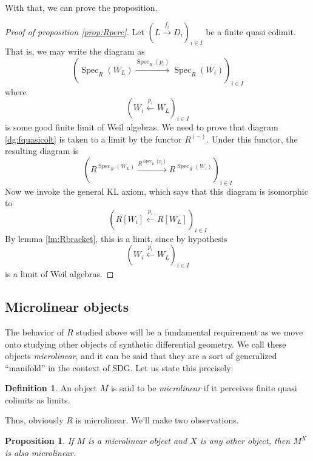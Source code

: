 \documentclass[11pt]{article}
\newtheorem{proposition}{Proposition}[section]
\theoremstyle{definition}
\newtheorem{defn}{Definition}[section]
\newcommand{\farg}{-} %
\DeclareMathOperator{\spec}{Spec}
\numberwithin{equation}{section}
\begin{document}
With that, we can prove the proposition.

\begin{proof}[Proof of proposition \ref{prop:Rperc}]
  Let \( \left(L\stackrel{f_i}{\longrightarrow}D_i\right)_{i\in I} \) be a finite quasi colimit. That is, we may write the diagram as
  \begin{equation}
    \left(\spec_R(W_L)\stackrel{\spec_R(p_i)}{\longrightarrow}\spec_R(W_i)\right)_{i\in I}
    \label{dg:fquasicolt}
  \end{equation}
  where
  \begin{equation*}
   \left(W_i\stackrel{p_i}{\longleftarrow}W_L\right)_{i\in I}
  \end{equation*}
  is some good finite limit of Weil algebras. We need to prove that diagram \ref{dg:fquasicolt} is taken to a limit by the functor \( R^{(\farg)} \). Under this functor, the resulting diagram is
  \begin{equation}
    \left(R^{\spec_R(W_L)}\stackrel{R^{\spec_R(p_i)}}{\longrightarrow}R^{\spec_R(W_i)}\right)_{i\in I}
    \label{dg:Rfqc}
  \end{equation}
  Now we invoke the general KL axiom, which says that this diagram is isomorphic to
  \begin{equation*}
    \left(R[W_i]\stackrel{p_i}{\longleftarrow}R[W_L]\right)_{i\in I}
  \end{equation*}
  By lemma \ref{lm:Rbracket}, this is a limit, since by hypothesis
  \begin{equation*}
   \left(W_i\stackrel{p_i}{\longleftarrow}W_L\right)_{i\in I}
  \end{equation*} 
  is a limit of Weil algebras.
\end{proof}

\subsection{Microlinear objects}

The behavior of \( R \) studied above will be a fundamental requirement as we move onto studying other objects of synthetic differential geometry. We call these objects \emph{microlinear}, and it can be said that they are a sort of generalized ``manifold'' in the context of SDG. Let us state this precisely:

\begin{defn}
  An object \( M \) is said to be \emph{microlinear} if it perceives finite quasi colimits as limits.
\end{defn}

Thus, obviously \( R \) is microlinear. We'll make two observations.

\begin{proposition}
  If \( M \) is a microlinear object and \( X \) is any other object, then \( M^X \) is also microlinear.
\end{proposition}

\clearpage


\end{document}
